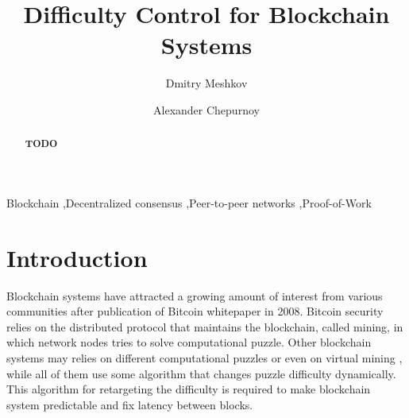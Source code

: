 \documentclass[number,preprint,review]{elsarticle}
\begin{document}
\begin{frontmatter}



\title{Difficulty Control for Blockchain Systems}



\author[iohk]{Dmitry Meshkov}

\author[iohk]{Alexander Chepurnoy}


\address[iohk]{IOHK Research}

\begin{abstract}
\textbf{TODO}
\end{abstract}

\begin{keyword}
Blockchain \sep Decentralized consensus \sep Peer-to-peer networks \sep Proof-of-Work
\end{keyword}

\end{frontmatter}


\section{Introduction}
\label{sec:intro}

Blockchain systems have attracted a growing amount of interest from various communities after publication of Bitcoin whitepaper \cite{Nakamoto2008} in 2008.
Bitcoin security relies on the distributed protocol that maintains the blockchain, called mining, in which network nodes tries to solve computational puzzle.
Other blockchain systems may relies on different computational puzzles \cite{??} or even on virtual mining \cite{??}, while all of them use some algorithm that changes puzzle difficulty dynamically.
This algorithm for retargeting the difficulty is required to make blockchain system predictable and fix latency between blocks.
\end{document}
